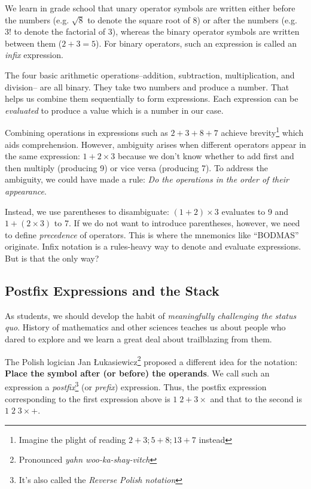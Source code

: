\documentclass[english,smartquotes]{hgbarticle}
\begin{document}
We learn in grade school that unary operator symbols are written either before the numbers (e.g. $\sqrt 8$ to denote the square root of 8) or after the numbers (e.g. $3!$ to denote the factorial of 3), whereas the binary operator symbols are written between them ($2 + 3 = 5$). For binary operators, such an expression is called an \emph{infix} expression.

The four basic arithmetic operations--addition, subtraction, multiplication, and division-- are all binary. They take two numbers and produce a number. That helps us combine them sequentially to form expressions. Each expression can be \textit{evaluated} to produce a value which is a number in our case.

Combining operations in expressions such as $2+3+8+7$ achieve brevity\footnote{Imagine the plight of reading $2+3; 5+8; 13+7$ instead} which aids comprehension. However, ambiguity arises when different operators appear in the same expression: $1+2\times 3$ because we don't know whether to add first and then multiply (producing 9) or vice versa (producing 7). To address the ambiguity, we could have made a rule: \textit{Do the operations in the order of their appearance}.  

Instead, we use parentheses to disambiguate: $(1+2)\times 3$ evaluates to 9 and $1+(2\times 3)$ to 7. If we do not want to introduce parentheses, however, we need to define \textit{precedence} of operators. This is where the mnemonics like ``BODMAS'' originate.  Infix notation is a rules-heavy way to denote and evaluate expressions. But is that the only way?

\subsection{Postfix Expressions and the Stack}
As students, we should develop the habit of \emph{meaningfully challenging the status quo}. History of mathematics and other sciences teaches us about people who dared to explore and we learn a great deal about trailblazing from them.

The Polish logician Jan Łukasiewicz\footnote{Pronounced \textit{yahn woo-ka-shay-vitch}} proposed a different idea for the notation\cite{Hamblin1962}: \textbf{Place the symbol after (or before) the operands}. We call such an expression a \emph{postfix}\footnote{It's also called the \emph{Reverse Polish notation}} (or \emph{prefix}) expression. Thus, the postfix expression corresponding to the first expression above is $1\;2 + 3\times$ and that to the second is $1\;2\;3\times +$. 
\end{document}
